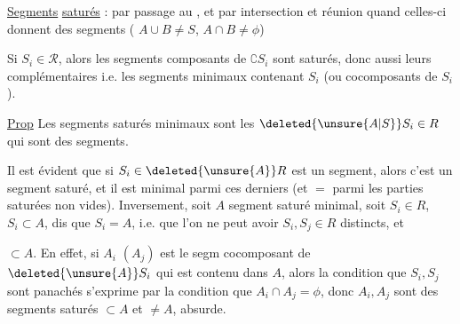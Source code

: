 \uline{Segments}  \uline{saturés} :  par passage au , et par intersection et réunion quand celles-ci donnent des segments ( $A\cup B\ne S$, $A\cap B\ne\phi$)

Si $S_i\in\mathcal{R}$, alors les segments composants de $\complement S_i$ sont saturés, donc aussi leurs complémentaires i.e. les segments minimaux contenant $S_i$ (ou  cocomposants de $S_i$). 

\noindent\llap{\rule[-.92\baselineskip]{.4pt}{1.8\baselineskip}\hspace{.35em}}\uline{Prop} Les segments saturés minimaux sont les $\deleted{\unsure{A|S}}S_i\in R$ qui sont des segments.

\reversemarginpar{}

Il est évident que si $S_i\in\deleted{\unsure{A}}R$ est un segment, alors c'est un segment saturé, et il est minimal parmi ces derniers (et $=$ parmi les parties saturées non vides). Inversement, soit $A$ segment saturé minimal,  soit $S_i\in R$, $S_i\subset A$,   dis que $S_i=A$,  i.e. que l'on ne peut avoir $S_i,S_j\in R$ distincts, et
\par\noindent\begin{minipage}[t]{.23\linewidth}
\vspace{0pt}
\end{minipage}\hfill\begin{minipage}[t]{.73\linewidth}
\vspace{0pt}
$\subset A$. En effet, si $A_i$ $(A_j)$ est le segm cocomposant de $\deleted{\unsure{A}}S_i$ qui est contenu dans $A$, alors la condition que $S_i,S_j$ sont  panachés s'exprime par la condition que $A_i\cap A_j=\phi$, donc $A_i,A_j$ sont des segments saturés $\subset A$ et $\ne A$, absurde.
\end{minipage}
\normalmarginpar

